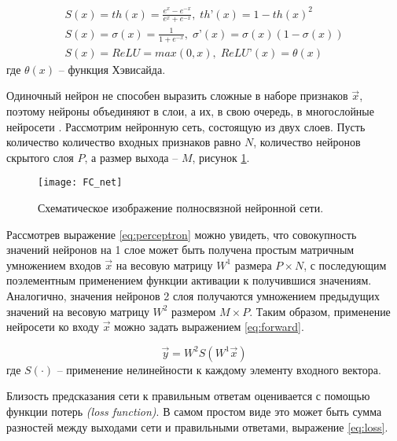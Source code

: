 \begin{equation}\label{eq:activations}
	\begin{gathered}
	    S(x) = th(x) = \frac{e^x - e^{-x}}{e^x + e^{-x}},    \;   th’(x) = 1 - th(x)^2   \\    
	    S(x) = \sigma(x) = \frac{1}{1 + e^{-x}},   \;   \sigma’(x) = \sigma(x)(1 - \sigma(x)) \\
	    S(x) = ReLU = max(0, x),   \;   ReLU’(x) = \theta(x)
	\end{gathered}
\end{equation}
где $\theta(x)$ -- функция Хэвисайда.


\indent
Одиночный нейрон не способен выразить сложные в наборе
признаков $\vec{x}$, поэтому нейроны объединяют в слои, а их, в свою 
очередь, в многослойные нейросети . Рассмотрим нейронную сеть,
состоящую из двух слоев. Пусть количество количество входных признаков
равно $N$, количество нейронов скрытого слоя $P$,
а размер выхода -- $M$, рисунок \ref{tikzpicture: fc_net}.
 
\begin{figure}[h!]
    \begin{center}
   	    \texttt{[image: FC\_net]}
   	\end{center}
   	\caption{Схематическое изображение полносвязной нейронной сети.}
   	\label{tikzpicture: fc_net}
\end{figure}

Рассмотрев выражение \ref{eq:perceptron} можно увидеть, что 
совокупность значений нейронов на 1 слое может быть получена 
простым матричным умножением входов $\vec{x}$ на весовую матрицу
 $W^1$ размера $P \times N$, с последующим поэлементным применением 
функции активации к получившися значениям. Аналогично, значения нейронов
2 слоя получаются умножением предыдущих значений на весовую матрицу
$W^2$ размером $M \times P$. Таким образом, применение нейросети
ко входу $\vec{x}$ можно задать выражением \ref{eq:forward}.

\begin{equation}\label{eq:forward}
	   \vec{y} = W^{2} S(W^{1} \vec{x})
\end{equation}
где $S(\cdot)$ -- применение нелинейности к каждому элементу входного 
вектора.

Близость предсказания сети к правильным ответам оценивается
с помощью функции потерь \textit{(loss function)}. В самом простом виде
это может быть сумма разностей между выходами сети и правильными ответами,
выражение \ref{eq:loss}.

